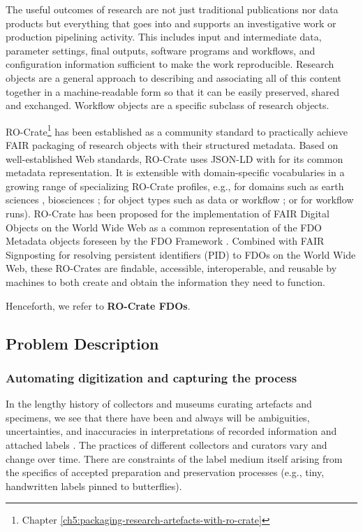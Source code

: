 The useful outcomes of research are not just traditional publications
nor data products but everything that goes into and supports an
investigative work or production pipelining activity. This includes
input and intermediate data, parameter settings, final outputs, software
programs and workflows, and configuration information sufficient to make
the work reproducible. Research objects \cite{Bechhofer 2013} are a general approach
to describing and associating all of this content together in a
machine-readable form so that it can be easily preserved, shared and
exchanged. Workflow objects are a specific subclass of research objects.

RO-Crate\footnote{Chapter \vref{ch5:packaging-research-artefacts-with-ro-crate}} \cite{OCarragain 2019,Soiland-Reyes 2022} has been established as a community standard to
practically achieve FAIR packaging of research objects with their
structured metadata. Based on well-established Web standards, RO-Crate
uses JSON-LD \cite{w3-json-ld} with \cite{schema.org} for its common metadata representation. It is extensible with
domain-specific vocabularies in a growing range of specializing RO-Crate
profiles, e.g., for domains such as earth sciences \cite{ch8-52}, biosciences
\cite{Goble 2021}; for object types such as data or workflow \cite{Bacall 2022}; or for
workflow runs). RO-Crate has been proposed for the implementation of
FAIR Digital Objects on the World Wide Web as a common representation of
the FDO Metadata objects foreseen by the FDO Framework \cite{Goble 2021,bonino2019}.
Combined with FAIR Signposting \cite{Van de Sompel 2022} for resolving persistent
identifiers (PID) to FDOs on the World Wide Web, these RO-Crates are
findable, accessible, interoperable, and reusable by machines to both
create and obtain the information they need to function.

Henceforth, we refer to \textbf{RO-Crate FDOs}.

\subsection{Problem Description}\label{problem-description}

\subsubsection{Automating digitization and capturing the process}\label{automating-digitization-and-capturing-the-process}


In the lengthy history of collectors and museums curating artefacts and
specimens, we see that there have been and always will be ambiguities,
uncertainties, and inaccuracies in interpretations of recorded
information and attached labels \cite{ch8-56}. The practices of different
collectors and curators vary and change over time. There are constraints
of the label medium itself arising from the specifics of accepted
preparation and preservation processes (e.g., tiny, handwritten labels
pinned to butterflies).

